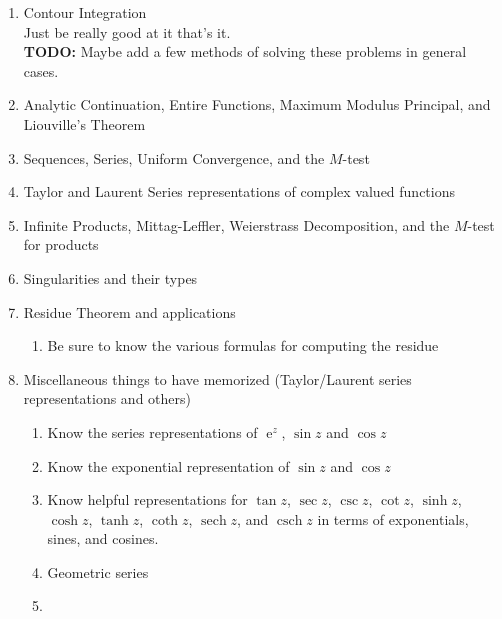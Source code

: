 \documentclass[10pt]{amsart}
\DeclareMathOperator{\E}{e}
\DeclareMathOperator{\sech}{sech}
\DeclareMathOperator{\csch}{csch}
\theoremstyle{nonumberplain}
\begin{document}
\begin{enumerate}[label={\bf {\arabic*}:}]
\item Contour Integration \\
Just be really good at it that's it. \\
\textbf{TODO: } Maybe add a few methods of solving these problems in general cases.\\

\item Analytic Continuation, Entire Functions, Maximum Modulus Principal, and Liouville's Theorem \\

\item Sequences, Series, Uniform Convergence, and the $M$-test \\

\item Taylor and Laurent Series representations of complex valued functions \\

\item Infinite Products, Mittag-Leffler, Weierstrass Decomposition, and the $M$-test for products \\

\item Singularities and their types \\

\item Residue Theorem and applications
\begin{enumerate}
\item Be sure to know the various formulas for computing the residue \\
\end{enumerate}

\item Miscellaneous things to have memorized (Taylor/Laurent series representations and others)
\begin{enumerate}
\item Know the series representations of $\E^z$, $\sin z$ and $\cos z$
\item Know the exponential representation of $\sin z$ and $\cos z$
\item Know helpful representations for $\tan z$, $\sec z$, $\csc z$, $\cot z$, $\sinh z$, $\cosh z$, $\tanh z$, $\coth z$, $\sech z$, and $\csch z$ in terms of exponentials, sines, and cosines.
\item Geometric series
\item
\end{enumerate}

\end{enumerate}
\end{document}
